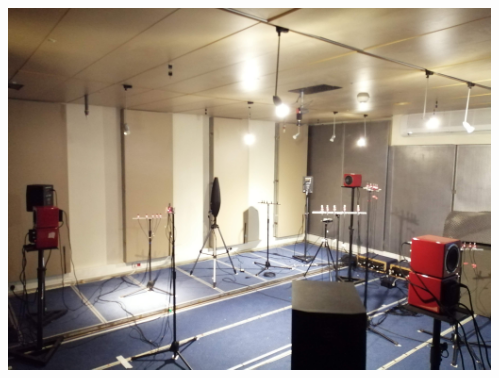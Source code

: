 \begin{frame}[t]{\dechorate  \hfill\faDatabase}
{\begin{columns}[T,onlytextwidth]
\begin{column}{0.3\textwidth}
            \end{column}\hfill
            \begin{column}{0.3\textwidth}
                \includegraphics[width=\textwidth]{figures/dechorate/panels}
            \end{column}
        \end{columns}
    }

\end{frame}




